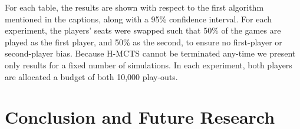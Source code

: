 \documentclass[a4paper]{llncs}
\begin{document}
For each table, the results are shown with respect to the first algorithm mentioned in the captions, along with a 95\% confidence interval. For each experiment, the players' seats were swapped such that 50\% of the games are played as the first player, and 50\% as the second, to ensure no first-player or second-player bias. Because H-MCTS cannot be terminated any-time we present only results for a fixed number of simulations. In each experiment, both players are allocated a budget of both 10,000 play-outs.

\section{Conclusion and Future Research}
\label{sec:concl}



\end{document}
